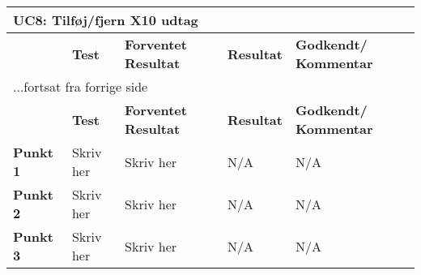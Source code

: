 
\begin{center}
\begin{longtable}{|p{}|p{}|p{3cm}|p{3cm}|p{3cm}|} %
\hline
\multicolumn{5}{|l|}{\textbf{UC8: Tilføj/fjern X10 udtag}} \\ \hline
\multicolumn{1}{|c|}{} &
\textbf{Test} &
\textbf{Forventet \newline Resultat} &
\textbf{Resultat} &
\textbf{Godkendt/ \newline Kommentar} \\ \hline 
\endfirsthead

\multicolumn{5}{l}{...fortsat fra forrige side} \\ \hline 
\multicolumn{1}{|c|}{} &
\textbf{Test} &
\textbf{Forventet \newline Resultat} &
\textbf{Resultat} &
\textbf{Godkendt/ \newline Kommentar} \\ \hline 
\endhead


\textbf{Punkt 1} &
Skriv her &
Skriv her &
N/A &
N/A \\\hline

\textbf{Punkt 2} &
Skriv her &
Skriv her &
N/A &
N/A \\\hline

\textbf{Punkt 3} &
Skriv her &
Skriv her &
N/A &
N/A \\\hline

	\end{longtable}
	\label{ATUC8} 
\end{center}